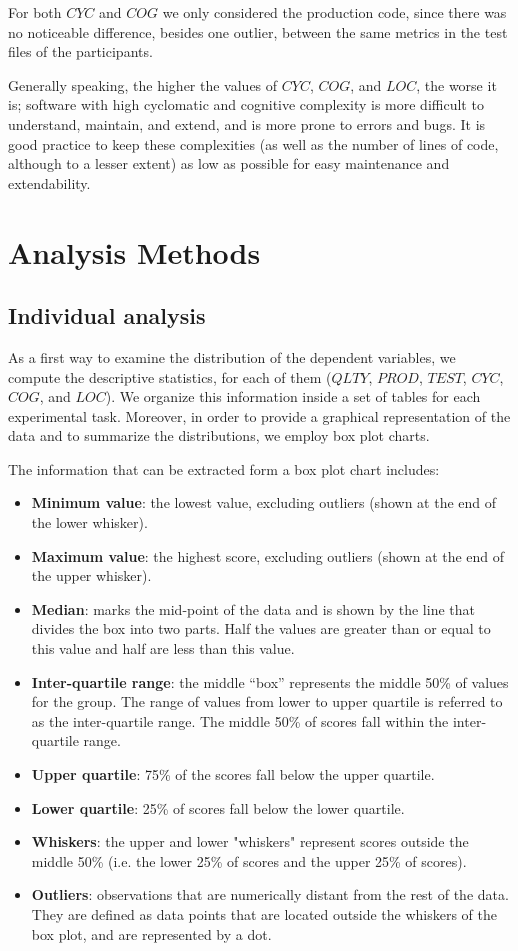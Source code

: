 For both $CYC$ and $COG$ we only considered the production code, since there was no noticeable difference, besides one outlier, between the same metrics in the test files of the participants.

Generally speaking, the higher the values of $CYC$, $COG$, and $LOC$, the worse it is; software with high cyclomatic and cognitive complexity is more difficult to understand, maintain, and extend, and is more prone to errors and bugs. It is good practice to keep these complexities (as well as the number of lines of code, although to a lesser extent) as low as possible for easy maintenance and extendability.





\section{Analysis Methods}
\subsection{Individual analysis}
As a first way to examine the distribution of the dependent variables, we compute the descriptive statistics, for each of them (\ie $QLTY$, $PROD$, $TEST$, $CYC$, $COG$, and $LOC$). We organize this information inside a set of tables for each experimental task. Moreover, in order to provide a graphical representation of the data and to summarize the distributions, we employ box plot charts.

The information that can be extracted form a box plot chart includes:
\begin{itemize}
    \item \textbf{Minimum value}: the lowest value, excluding outliers (shown at the end of the lower whisker).
    \item \textbf{Maximum value}: the highest score, excluding outliers (shown at the end of the upper whisker).
    \item \textbf{Median}: marks the mid-point of the data and is shown by the line that divides the box into two parts. Half the values are greater than or equal to this value and half are less than this value.
    \item \textbf{Inter-quartile range}: the middle “box” represents the middle 50\% of values for the group. The range of values from lower to upper quartile is referred to as the inter-quartile range. The middle 50\% of scores fall within the inter-quartile range.
    \item \textbf{Upper quartile}: 75\% of the scores fall below the upper quartile.
    \item \textbf{Lower quartile}: 25\% of scores fall below the lower quartile.
    \item \textbf{Whiskers}: the upper and lower "whiskers" represent scores outside the middle 50\% (i.e. the lower 25\% of scores and the upper 25\% of scores).
    \item \textbf{Outliers}: observations that are numerically distant from the rest of the data. They are defined as data points that are located outside the whiskers of the box plot, and are represented by a dot.
\end{itemize}


